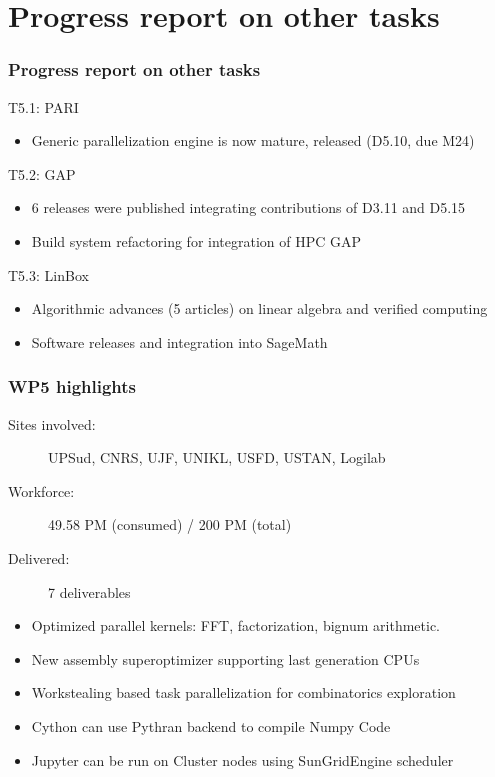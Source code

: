 \documentclass{beamer}
\begin{document}
\section{Progress report on other tasks}
\begin{frame}
  \frametitle{Progress report on other tasks}

  \begin{block}{T5.1: PARI}
    \begin{itemize}
    \item Generic parallelization engine is now mature, released (D5.10, due M24)
    \end{itemize}
  \end{block}
  \begin{block}{T5.2: GAP}
    \begin{itemize}
    \item 6 releases were published integrating contributions of D3.11 and D5.15
    \item Build system refactoring for integration of HPC GAP
    \end{itemize}
  \end{block}
  \begin{block}{T5.3: LinBox}
    \begin{itemize}
    \item Algorithmic advances (5  articles) on linear algebra and
      verified computing
    \item Software releases and integration into SageMath
    \end{itemize}
  \end{block}
\end{frame}


\begin{frame}
  \frametitle{WP5 highlights}
  \begin{description}
  \item[Sites involved:] UPSud, CNRS, UJF, UNIKL, USFD, USTAN, Logilab
  \item[Workforce:] 49.58 PM (consumed) / 200 PM (total)
  \item[Delivered:] 7 deliverables
  \end{description}

  \begin{itemize}
  \item Optimized parallel kernels: FFT, factorization, bignum arithmetic.
  \item New assembly superoptimizer supporting last generation CPUs
  \item Workstealing based task parallelization for combinatorics exploration
  \item Cython can use Pythran backend to compile Numpy Code
  \item Jupyter can be run on Cluster nodes using SunGridEngine scheduler
  \end{itemize}
\end{frame}
\end{document}
